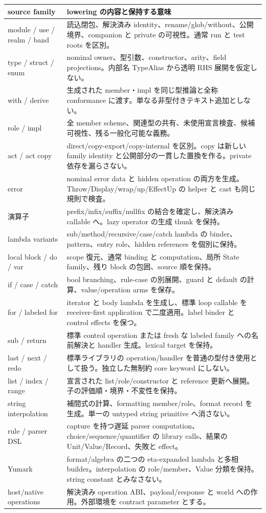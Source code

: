 \documentclass[11pt,a4paper]{article}
\theoremstyle{remark}
\begin{document}
\begin{longtable}{p{}p{}}
\toprule
source family & lowering の内容と保持する意味 \\
\midrule\endhead
module / use / realm / band & 読込閉包、解決済み identity、rename/glob/without、公開境界、companion と private の可視性。通常 run と test roots を区別。\\
type / struct / enum & nominal owner、型引数、constructor、arity、field projections。内部名 TypeAlias から透明 RHS 展開を仮定しない。\\
with / derive & 生成された member・impl を同じ型推論と全称 conformance に渡す。単なる非型付きテキスト追加としない。\\
role / impl & 全 member scheme、関連型の共有、未使用宣言検査、候補可視性、残る一般化可能な義務。\\
act / act copy & direct/copy-export/copy-internal を区別。copy は新しい family identity と公開部分の一貫した置換を作る。private 依存を漏らさない。\\
error & nominal error data と hidden operation の両方を生成。Throw/Display/wrap/up/EffectUp の helper と cast も同じ規則で検査。\\
演算子 & prefix/infix/suffix/nullfix の結合を確定し、解決済み callable へ。lazy operator の生成 thunk を保持。\\
lambda variants & sub/method/recursive/case/catch lambda の binder、pattern、entry role、hidden references を個別に保持。\\
local block / do / var & scope 復元、通常 binding と computation、局所 State family、残り block の包囲、source 順を保持。\\
if / case / catch & bool branching、rule-case の別展開、guard と default の計算、value/operation arms を保存。\\
for / labeled for & iterator と body lambda を生成し、標準 loop callable を receiver-first application で二度適用。label binder と control effects を保つ。\\
sub / return & 標準 control operation または fresh な labeled family への名前解決と handler 生成。lexical target を保持。\\
last / next / redo & 標準ライブラリの operation/handler を普通の型付き使用として扱う。独立した無制約 core keyword にしない。\\
list / index / range & 宣言された list/role/constructor と reference 更新へ展開。子の評価順・境界・不変性を保持。\\
string interpolation & 補間式の計算、formatting member/role、format record を生成。単一の untyped string primitive へ消さない。\\
rule / parser DSL & capture を持つ遅延 parser computation、choice/sequence/quantifier の library calls、結果の Unit/Value/Record、失敗と effect。\\
Yumark & format/algebra の二つの eta-expanded lambda と多相 builder。interpolation の role/member、Value 分類を保持。string constant とみなさない。\\
host/native operations & 解決済み operation ABI、payload/response と world への作用。外部環境を contract parameter とする。\\
\bottomrule
\end{longtable}
\end{document}
